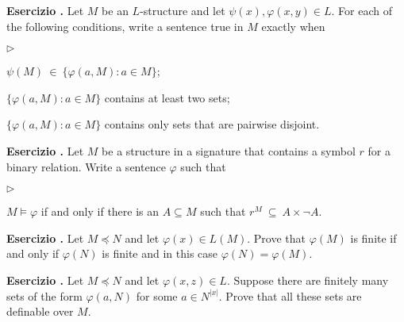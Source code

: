 \documentclass[10pt]{article}
\def\phi{\varphi}
\newcommand{\labella}[1]{{\sf\footnotesize #1}\hfill}
\renewenvironment{itemize}
  {\begin{list}{$\triangleright$}{%
   \setlength{\parskip}{0mm}
   \setlength{\topsep}{0mm}
   \setlength{\rightmargin}{0mm}
   \setlength{\listparindent}{0mm}
   \setlength{\itemindent}{0mm}
   \setlength{\labelwidth}{3ex}
   \setlength{\itemsep}{0mm}
   \setlength{\parsep}{0mm}
   \setlength{\partopsep}{0mm}
   \setlength{\labelsep}{1ex}
   \setlength{\leftmargin}{\labelwidth+\labelsep}
   \let\makelabel\labella}}{%
   \end{list}}
\newcounter{ex}
\newenvironment{exercise}{\clearpage\addtocounter{ex}{1}\textbf{Esercizio \theex.\quad}}{}
\begin{document}
\begin{exercise}
  Let $M$ be an $L$-structure and let $\psi(x), \phi(x,y)\in L$. For each of the following conditions, write a sentence true in $M$ exactly when
  \begin{itemize}
  \item[a.] $\psi(M)\ \in\ \big\{\phi(a,M): a\in M\big\}$;
  \item[b.] $\big\{\phi(a,M): a\in M\big\}$ contains at least two sets;
  \item[c.] $\big\{\phi(a,M): a\in M\big\}$ contains only sets that are pairwise disjoint.
  \end{itemize}
  \end{exercise}
  
  \begin{exercise}
  Let $M$ be a structure in a signature that contains a symbol $r$ for a binary relation.
  Write a sentence $\phi$ such that 
  \begin{itemize} 
  \item[a.] $M\models\phi$ if and only if there is an $A\subseteq M$ such that $r^M\ \subseteq\ A\times\neg A$.
  \end{itemize}
  \end{exercise}
  

\begin{exercise}
  Let $M\preceq N$ and let $\phi(x)\in L(M)$.
  Prove that $\phi(M)$ is finite if and only if $\phi(N)$ is finite and in this case $\phi(N)=\phi(M)$.
  \end{exercise}
  
  \begin{exercise}
  Let $M\preceq N$ and let $\phi(x,z)\in L$.
  Suppose there are finitely many sets of the form $\phi(a,N)$ for some $a\in N^{|x|}$.
  Prove that all these sets are definable over $M$.
  \end{exercise}
\end{document}
